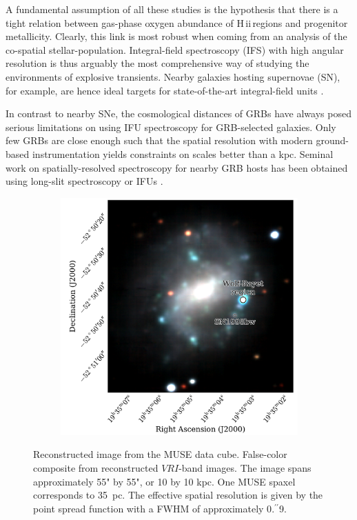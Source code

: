 \documentclass[traditabstract]{aa}
\newcommand{\farc}{\hbox{$.\!\!^{\prime\prime}$}}
\newcommand{\hii}{\mbox{H\,{\sc ii}}}
\begin{document}
A fundamental assumption of all these studies is the hypothesis that there is a tight relation between gas-phase oxygen abundance of \hii\,regions and progenitor metallicity. Clearly, this link is most robust when coming from an analysis of the co-spatial stellar-population. Integral-field spectroscopy (IFS) with high angular resolution is thus arguably the most comprehensive way of studying the environments of explosive transients. Nearby galaxies hosting supernovae (SN), for example, are hence ideal targets for state-of-the-art integral-field units \citep[IFUs, e.g.,][]{2013AJ....146...30K, 2014A&A...572A..38G}.

In contrast to nearby SNe, the cosmological distances of GRBs \citep[e.g.,][]{2009ApJS..185..526F} have always posed serious limitations on using IFU spectroscopy for GRB-selected galaxies. Only few GRBs are close enough such that the spatial resolution with modern ground-based instrumentation yields constraints on scales better than a kpc. Seminal work on spatially-resolved spectroscopy for nearby GRB hosts has been obtained using long-slit spectroscopy \citep[e.g.,][]{2008ApJ...676.1151T, 2011ApJ...739...23L, 2015A&A...579A.126S} or IFUs \citep{2008A&A...490...45C, 2014MNRAS.441.2034T}. 

\begin{figure}
\begin{subfigure}{.42\textwidth}
  \includegraphics[width=0.990\linewidth]{Figs/MUSE_SN1998bw_RGB.pdf}
\end{subfigure}
\caption{Reconstructed image from the MUSE data cube. False-color composite from reconstructed $VRI$-band images. The image spans approximately 55" by 55", or 10 by 10 kpc. One MUSE spaxel corresponds to 35~pc. The effective spatial resolution is given by the point spread function with a FWHM of approximately 0\farc{9}.}
\label{fig:HaEW}
\end{figure}
\end{document}
